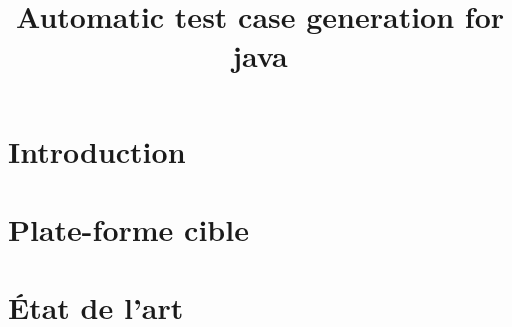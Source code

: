 \documentclass[a4paper]{report}
\title{Automatic test case generation for java}
\begin{document}
\tableofcontents

\renewcommand{\thesection}{\arabic{section}}

\newtheorem{theorem}{Theorem}
\newtheorem{lemma}{Lemme}

\renewcommand{\thetheorem}{\empty{}}
\renewcommand{\thelemma}{\empty{}} 

\newenvironment{proof}[1][Proof]{\begin{trivlist}
\item[\hskip \labelsep {\bfseries #1}]}{\end{trivlist}}
\newenvironment{definition}[1][Definition]{\begin{trivlist}
\item[\hskip \labelsep {\bfseries #1}]}{\end{trivlist}}
\newenvironment{example}[1][Example]{\begin{trivlist}
\item[\hskip \labelsep {\bfseries #1}]}{\end{trivlist}}
\newenvironment{remark}[1][Rq:]{\begin{trivlist}
\item[\hskip \labelsep {\bfseries #1}]}{\end{trivlist}}
\newenvironment{rappel}[1][rappel:]{\begin{trivlist}
\item[\hskip \labelsep {\bfseries #1}]}{\end{trivlist}}


\chapter*{Introduction}




\chapter*{Plate-forme cible}




\chapter*{État de l'art}
\end{document}
